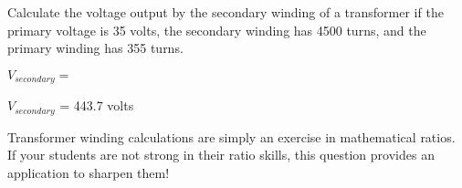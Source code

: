 

Calculate the voltage output by the secondary winding of a transformer if the primary voltage is 35 volts, the secondary winding has 4500 turns, and the primary winding has 355 turns.

\vskip 10pt

$V_{secondary} =$

\vskip 10pt







$V_{secondary}$ = 443.7 volts







Transformer winding calculations are simply an exercise in mathematical ratios.  If your students are not strong in their ratio skills, this question provides an application to sharpen them!




